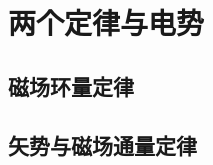 

\section{两个定律与电势}\label{18-2}

\subsection{磁场环量定律}\label{18-2-1}

\subsection{矢势与磁场通量定律}\label{18-2-2}
